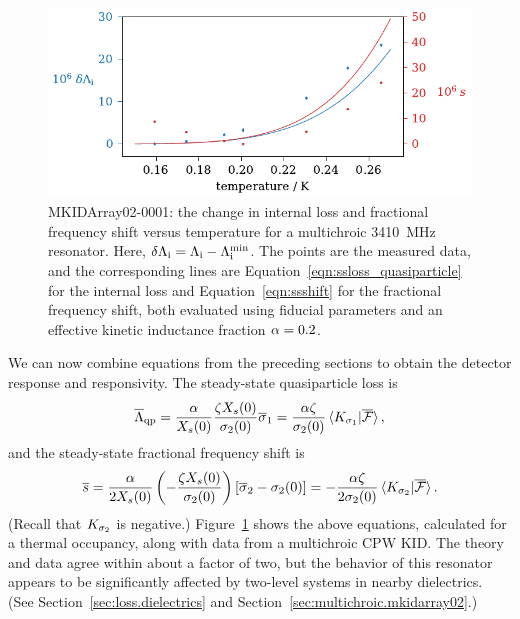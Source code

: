 \begin{figure}[htb]
\centering
\includegraphics[width=\textwidth]{theory/mkidarray02_chosen_one_di_and_s_versus_temperature.pdf}
\caption[MKIDArray02-0001: the internal loss and fractional frequency shift versus temperature for a multichroic \SI{3410}{MHz} resonator.]
{
MKIDArray02-0001: the change in internal loss and fractional frequency shift versus temperature for a multichroic \SI{3410}{MHz} resonator.
Here,
$\delta\Lambda_{\mathrm{i}} = \Lambda_{\mathrm{i}} - \Lambda_{\mathrm{i}}^\mathrm{min}$.
The points are the measured data, and the corresponding lines are Equation~\ref{eqn:ssloss_quasiparticle} for the internal loss and Equation~\ref{eqn:ssshift} for the fractional frequency shift, both evaluated using fiducial parameters and an effective kinetic inductance fraction $\alpha = 0.2$.
}
\label{fig:mkidarray02_chosen_one_di_and_s_versus_temperature}
\end{figure}

We can now combine equations from the preceding sections to obtain the detector response and responsivity.
The steady-state quasiparticle loss is
\begin{equation}
\overline{\Lambda}_{\mathrm{qp}}
  =
  \frac{\alpha}{X_s(0)}
  \frac{\zeta X_s(0)}{\sigma_2(0)}
  \overline{\sigma}_1
  =
  \frac{\alpha \zeta}{\sigma_2(0)}
  \braket*{K_{\sigma_1}}{\overline{\mathcal{F}}},
\label{eqn:ssloss_quasiparticle}
\end{equation}
and the steady-state fractional frequency shift is
\begin{equation}
\overline{s}
  =
  \frac{\alpha}{2 X_s(0)}
  \left( -\frac{\zeta X_s(0)}{\sigma_2(0)} \right)
  \left[ \overline{\sigma}_2 - \sigma_2(0) \right]
  =
  -\frac{\alpha \zeta}{2 \sigma_2(0)}
  \braket*{K_{\sigma_2}}{\overline{\mathcal{F}}}.
\label{eqn:ssshift}
\end{equation}
(Recall that $K_{\sigma_2}$ is negative.)
Figure~\ref{fig:mkidarray02_chosen_one_di_and_s_versus_temperature} shows the above equations, calculated for a thermal occupancy, along with data from a multichroic CPW KID.
The theory and data agree within about a factor of two, but the behavior of this resonator appears to be significantly affected by two-level systems in nearby dielectrics.
(See Section~\ref{sec:loss.dielectrics} and Section~\ref{sec:multichroic.mkidarray02}.)

